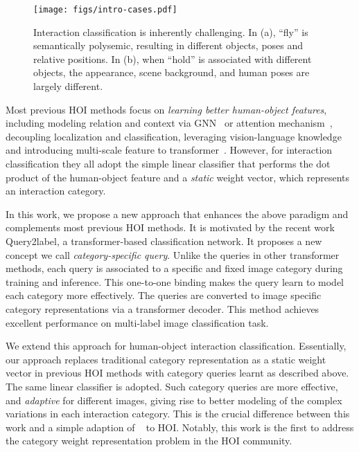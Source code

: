\documentclass[10pt,twocolumn,letterpaper]{article}
\begin{document}
\begin{figure}[t]
    \centering
    \texttt{[image: figs/intro-cases.pdf]}
    \caption{
Interaction classification is inherently challenging.
    In (a), ``fly'' is semantically polysemic, resulting in different objects, poses and relative positions.
    In (b), when ``hold'' is associated with different objects, the appearance, scene background, and human poses are largely different.
}
\vspace{-8pt}
\label{fig:intro-cases}
\end{figure}

Most previous HOI methods focus on \emph{learning better human-object features}, including modeling relation and context via GNN~\cite{qi2018learning, ulutan2020vsgnet, wang2020contextual, gao2020drg} or attention mechanism~\cite{gao2018ican, ulutan2020vsgnet, zhong2021polysemy}, decoupling localization and classification\cite{zhang2021mining, zhou2022disentangled, liao2022gen}, leveraging vision-language knowledge~\cite{liao2022gen, dong2022catn} and introducing multi-scale feature to transformer~\cite{kim2022mstr}. However, for interaction classification they all adopt the simple linear classifier that performs the dot product of the human-object feature and a \emph{static} weight vector, which represents an interaction category.

In this work, we propose a new approach that enhances the above paradigm and complements most previous HOI methods. It is motivated by the recent work Query2label\cite{liu2021query2label}, a transformer-based classification network. It proposes a new concept we call \emph{category-specific query}. Unlike the queries in other transformer methods, each query is associated to a specific and fixed image category during training and inference. This one-to-one binding makes the query learn to model each category more effectively. The queries are converted to image specific category representations via a transformer decoder. This method achieves excellent performance on multi-label image classification task.

We extend this approach for human-object interaction classification. Essentially, our approach replaces traditional category representation as a static weight vector in previous HOI methods with category queries learnt as described above. The same linear classifier is adopted. Such category queries are more effective, and \emph{adaptive} for different images, giving rise to better modeling of the complex variations in each interaction category. This is the crucial difference between this work and a simple adaption of ~\cite{liu2021query2label} to HOI. Notably, this work is the first to address the category weight representation problem in the HOI community.
\end{document}
